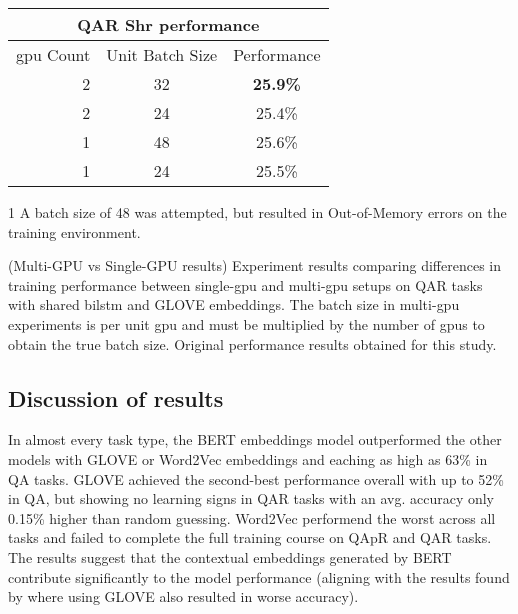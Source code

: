 \begin{table}[]
    \begin{threeparttable}
        \begin{tabular}{rc|c}
            \toprule
            \multicolumn{3}{c}{QA\rightarrow{}R Shr performance}         \\
            \midrule
            \gls{gpu} Count & Unit Batch Size & Performance              \\
            2               & 32              & \textbf{25.9\%}\tnote{1} \\
            2               & 24              & 25.4\%                   \\
            1               & 48              & 25.6\%                   \\
            1               & 24              & 25.5\%                   \\
            \bottomrule
        \end{tabular}
        \begin{tablenotes}
            \item[1] A batch size of 48 was attempted, but resulted in Out-of-Memory errors on the training environment.
        \end{tablenotes}
    \end{threeparttable}
    \captionsource(Multi-GPU vs Single-GPU results)
    {Experiment results comparing differences in training performance between single-\gls{gpu} and multi-\gls{gpu} setups on QA\rightarrow{}R tasks with shared \gls{bilstm} and GLOVE embeddings. The batch size in multi-\gls{gpu} experiments is per unit \gls{gpu} and must be multiplied by the number of \glspl{gpu} to obtain the true batch size. \label{tab:single-vs-multi-gpu-experiment-results}}
    {Original performance results obtained for this study.}
\end{table}

\subsection{Discussion of results}
\label{subsec:discussion_of_results}

In almost every task type, the BERT embeddings model outperformed the other models with GLOVE or Word2Vec embeddings and eaching as high as 63\% in Q\rightarrow{}A tasks.
GLOVE achieved the second-best performance overall with up to 52\% in Q\rightarrow{}A, but showing no learning signs in Q\rightarrow{}AR tasks with an avg. accuracy only 0.15\% higher than random guessing.
Word2Vec performend the worst across all tasks and failed to complete the full training course on QAp\rightarrow{}R and Q\rightarrow{}AR tasks.
The results suggest that the contextual embeddings generated by BERT contribute significantly to the model performance (aligning with the results found by \citeauthor{zellers_recognition_2019} where using GLOVE also resulted in worse accuracy\cite{zellers_recognition_2019}).


